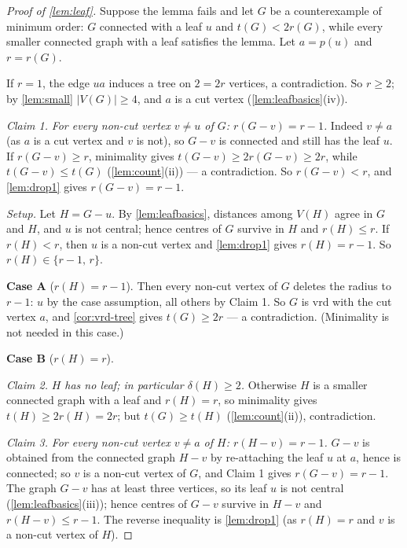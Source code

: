 \documentclass[11pt]{article}
\theoremstyle{definition}
\begin{document}
\begin{proof}[Proof of \cref{lem:leaf}]
Suppose the lemma fails and let $G$ be a counterexample of minimum order:
$G$ connected with a leaf $u$ and $t(G)<2r(G)$, while every smaller connected
graph with a leaf satisfies the lemma.  Let $a=p(u)$ and $r=r(G)$.

If $r=1$, the edge $ua$ induces a tree on $2=2r$ vertices, a contradiction.
So $r\ge2$; by \cref{lem:small} $|V(G)|\ge4$, and $a$ is a cut vertex
(\cref{lem:leafbasics}(iv)).

\emph{Claim 1.} \emph{For every non-cut vertex $v\ne u$ of $G$:
$r(G-v)=r-1$.}
Indeed $v\ne a$ (as $a$ is a cut vertex and $v$ is not), so $G-v$ is
connected and still has the leaf $u$.  If $r(G-v)\ge r$, minimality
gives $t(G-v)\ge2r(G-v)\ge2r$, while $t(G-v)\le t(G)$
(\cref{lem:count}(ii)) --- a contradiction.  So $r(G-v)<r$, and
\cref{lem:drop1} gives $r(G-v)=r-1$.

\emph{Setup.} Let $H=G-u$.  By \cref{lem:leafbasics}, distances among
$V(H)$ agree in $G$ and $H$, and $u$ is not central; hence centres of
$G$ survive in $H$ and $r(H)\le r$.  If $r(H)<r$, then $u$ is a
non-cut vertex and \cref{lem:drop1} gives $r(H)=r-1$.  So
$r(H)\in\{r-1,\,r\}$.

\medskip
\noindent\textbf{Case A} ($r(H)=r-1$).
Then every non-cut vertex of $G$ deletes the radius to $r-1$: $u$ by the
case assumption, all others by Claim 1.  So $G$ is vrd with the cut vertex
$a$, and \cref{cor:vrd-tree} gives $t(G)\ge2r$ --- a contradiction.
(Minimality is not needed in this case.)

\medskip
\noindent\textbf{Case B} ($r(H)=r$).

\emph{Claim 2.} \emph{$H$ has no leaf; in particular $\delta(H)\ge2$.}
Otherwise $H$ is a smaller connected graph with a leaf and
$r(H)=r$, so minimality gives $t(H)\ge2r(H)=2r$; but
$t(G)\ge t(H)$ (\cref{lem:count}(ii)), contradiction.

\emph{Claim 3.} \emph{For every non-cut vertex $v\ne a$ of $H$:
$r(H-v)=r-1$.}
$G-v$ is obtained from the connected graph $H-v$ by re-attaching the
leaf $u$ at $a$, hence is connected; so $v$ is a non-cut vertex of
$G$, and Claim 1 gives $r(G-v)=r-1$.  The graph $G-v$ has at least
three vertices, so its leaf $u$ is not central
(\cref{lem:leafbasics}(iii)); hence centres of $G-v$ survive in
$H-v$ and $r(H-v)\le r-1$.  The reverse inequality is
\cref{lem:drop1} (as $r(H)=r$ and $v$ is a non-cut vertex of
$H$).


\end{proof}
\end{document}
